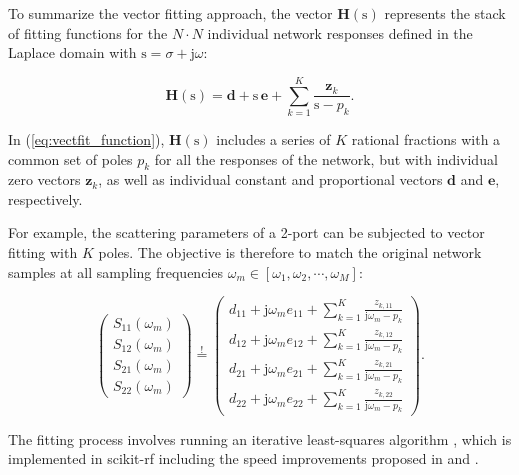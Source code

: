 \documentclass[10pt, letterpaper]{scrartcl}
\newcommand{\skrf}{{s}cikit-rf\xspace}
\begin{document}
To summarize the vector fitting approach, the vector $\mathbf{H}(\mathrm{s})$ represents the stack of fitting functions for the $N \cdot N$ individual network responses defined in the Laplace domain with $\mathrm{s} = \sigma + \mathrm{j} \omega$:

\begin{equation}
\mathbf{H}(\mathrm{s}) = \mathbf{d} + \mathrm{s} \, \mathbf{e} + \sum _{k=1} ^{K} \frac{\mathbf{z}_k}{\mathrm{s} - p_k}.
\label{eq:vectfit_function}
\end{equation}

In (\ref{eq:vectfit_function}), $\mathbf{H}(\mathrm{s})$ includes a series of $K$ rational fractions with a common set of poles $p_k$ for all the responses of the network, but with individual zero vectors $\mathbf{z}_{k}$, as well as individual constant and proportional vectors $\mathbf{d}$ and $\mathbf{e}$, respectively.

For example, the scattering parameters of a 2-port can be subjected to vector fitting with $K$ poles. The objective is therefore to match the original network samples at all sampling frequencies $\omega_m \in [\omega_1, \omega_2, \cdots, \omega_M]$:

\begin{equation}
\begin{pmatrix}
S_{11} (\omega_m) \\
S_{12} (\omega_m) \\
S_{21} (\omega_m) \\
S_{22} (\omega_m)
\end{pmatrix} 
\overset{!}{=}
\begin{pmatrix}
d_{11} + \mathrm{j} \omega_m e_{11} + \sum _{k=1} ^{K} \frac{z_{k,11}}{\mathrm{j} \omega_m - p_k} \\
d_{12} + \mathrm{j} \omega_m e_{12} + \sum _{k=1} ^{K} \frac{z_{k,12}}{\mathrm{j} \omega_m - p_k} \\
d_{21} + \mathrm{j} \omega_m e_{21} + \sum _{k=1} ^{K} \frac{z_{k,21}}{\mathrm{j} \omega_m - p_k} \\
d_{22} + \mathrm{j} \omega_m e_{22} + \sum _{k=1} ^{K} \frac{z_{k,22}}{\mathrm{j} \omega_m - p_k}
\end{pmatrix} .
\end{equation}

The fitting process involves running an iterative least-squares algorithm \cite{vectfit}, which is implemented in \skrf{} including the speed improvements proposed in \cite{vectfit_improved} and \cite{vectfit_fast}.
\end{document}

